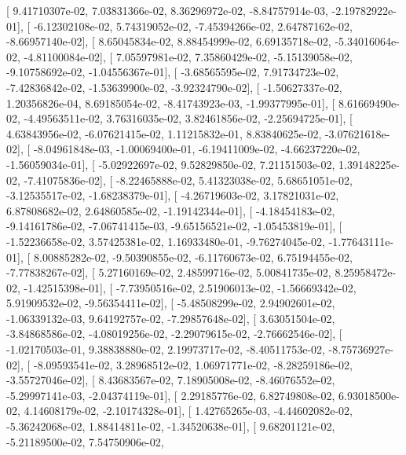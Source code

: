 \documentclass{article}
\begin{document}
       [  9.41710307e-02,   7.03831366e-02,   8.36296972e-02,
         -8.84757914e-03,  -2.19782922e-01],
       [ -6.12302108e-02,   5.74319052e-02,  -7.45394266e-02,
          2.64787162e-02,  -8.66957140e-02],
       [  8.65045834e-02,   8.88454999e-02,   6.69135718e-02,
         -5.34016064e-02,  -4.81100084e-02],
       [  7.05597981e-02,   7.35860429e-02,  -5.15139058e-02,
         -9.10758692e-02,  -1.04556367e-01],
       [ -3.68565595e-02,   7.91734723e-02,  -7.42836842e-02,
         -1.53639900e-02,  -3.92324790e-02],
       [ -1.50627337e-02,   1.20356826e-04,   8.69185054e-02,
         -8.41743923e-03,  -1.99377995e-01],
       [  8.61669490e-02,  -4.49563511e-02,   3.76316035e-02,
          3.82461856e-02,  -2.25694725e-01],
       [  4.63843956e-02,  -6.07621415e-02,   1.11215832e-01,
          8.83840625e-02,  -3.07621618e-02],
       [ -8.04961848e-03,  -1.00069400e-01,  -6.19411009e-02,
         -4.66237220e-02,  -1.56059034e-01],
       [ -5.02922697e-02,   9.52829850e-02,   7.21151503e-02,
          1.39148225e-02,  -7.41075836e-02],
       [ -8.22465888e-02,   5.41323038e-02,   5.68651051e-02,
         -3.12535517e-02,  -1.68238379e-01],
       [ -4.26719603e-02,   3.17821031e-02,   6.87808682e-02,
          2.64860585e-02,  -1.19142344e-01],
       [ -4.18454183e-02,  -9.14161786e-02,  -7.06741415e-03,
         -9.65156521e-02,  -1.05453819e-01],
       [ -1.52236658e-02,   3.57425381e-02,   1.16933480e-01,
         -9.76274045e-02,  -1.77643111e-01],
       [  8.00885282e-02,  -9.50390855e-02,  -6.11760673e-02,
          6.75194455e-02,  -7.77838267e-02],
       [  5.27160169e-02,   2.48599716e-02,   5.00841735e-02,
          8.25958472e-02,  -1.42515398e-01],
       [ -7.73950516e-02,   2.51906013e-02,  -1.56669342e-02,
          5.91909532e-02,  -9.56354411e-02],
       [ -5.48508299e-02,   2.94902601e-02,  -1.06339132e-03,
          9.64192757e-02,  -7.29857648e-02],
       [  3.63051504e-02,  -3.84868586e-02,  -4.08019256e-02,
         -2.29079615e-02,  -2.76662546e-02],
       [ -1.02170503e-01,   9.38838880e-02,   2.19973717e-02,
         -8.40511753e-02,  -8.75736927e-02],
       [ -8.09593541e-02,   3.28968512e-02,   1.06971771e-02,
         -8.28259186e-02,  -3.55727046e-02],
       [  8.43683567e-02,   7.18905008e-02,  -8.46076552e-02,
         -5.29997141e-03,  -2.04374119e-01],
       [  2.29185776e-02,   6.82749808e-02,   6.93018500e-02,
          4.14608179e-02,  -2.10174328e-01],
       [  1.42765265e-03,  -4.44602082e-02,  -5.36242068e-02,
          1.88414811e-02,  -1.34520638e-01],
       [  9.68201121e-02,  -5.21189500e-02,   7.54750906e-02,
\end{document}
